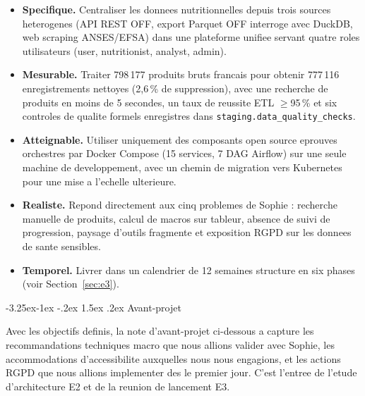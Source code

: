 \documentclass[a4paper,11pt,oneside,openany]{report}
\makeatletter
\renewcommand\subsection{\@startsection{subsection}{2}{\z@}%
  {-3.25ex\@plus -1ex \@minus -.2ex}%
  {1.5ex \@plus .2ex}%
  {\normalfont\large\bfseries\color{ntdarkgreen}}}
\newcommand{\rgpd}{RGPD}
\makeatother
\begin{document}
\begin{itemize}[nosep]
  \item \textbf{Specifique.} Centraliser les donnees nutritionnelles
        depuis trois sources heterogenes (API REST OFF, export
        Parquet OFF interroge avec DuckDB, web scraping ANSES/EFSA)
        dans une plateforme unifiee servant quatre roles utilisateurs
        (user, nutritionist, analyst, admin).
  \item \textbf{Mesurable.} Traiter 798\,177 produits bruts francais
        pour obtenir 777\,116 enregistrements nettoyes (2,6\,\% de
        suppression), avec une recherche de produits en moins de
        5 secondes, un taux de reussite ETL $\geq$95\,\% et six
        controles de qualite formels enregistres dans
        \texttt{staging.data\_quality\_checks}.
  \item \textbf{Atteignable.} Utiliser uniquement des composants
        open source eprouves orchestres par Docker Compose
        (15 services, 7 DAG Airflow) sur une seule machine de
        developpement, avec un chemin de migration vers Kubernetes
        pour une mise a l'echelle ulterieure.
  \item \textbf{Realiste.} Repond directement aux cinq problemes de
        Sophie : recherche manuelle de produits, calcul de macros sur
        tableur, absence de suivi de progression, paysage d'outils
        fragmente et exposition \rgpd{} sur les donnees de sante
        sensibles.
  \item \textbf{Temporel.} Livrer dans un calendrier de 12 semaines
        structure en six phases (voir Section~\ref{sec:e3}).
\end{itemize}

\subsection{Avant-projet}

Avec les objectifs definis, la note d'avant-projet ci-dessous a
capture les recommandations techniques macro que nous allions valider
avec Sophie, les accommodations d'accessibilite auxquelles nous nous
engagions, et les actions \rgpd{} que nous allions implementer des
le premier jour. C'est l'entree de l'etude d'architecture E2 et de
la reunion de lancement E3.
\end{document}
